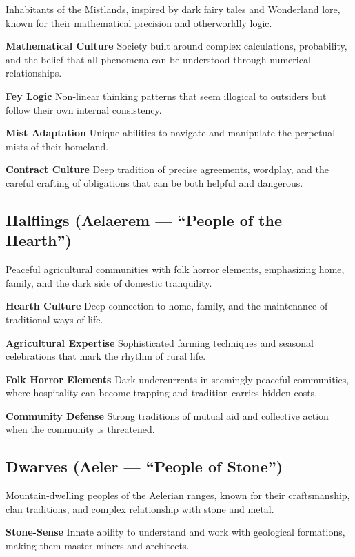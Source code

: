 \documentclass[11pt,twoside,openany]{book}
\begin{document}
Inhabitants of the Mistlands, inspired by dark fairy tales and Wonderland lore, known for their mathematical precision and otherworldly logic.

\textbf{Mathematical Culture} Society built around complex calculations, probability, and the belief that all phenomena can be understood through numerical relationships.

\textbf{Fey Logic} Non-linear thinking patterns that seem illogical to outsiders but follow their own internal consistency.

\textbf{Mist Adaptation} Unique abilities to navigate and manipulate the perpetual mists of their homeland.

\textbf{Contract Culture} Deep tradition of precise agreements, wordplay, and the careful crafting of obligations that can be both helpful and dangerous.

\subsection*{Halflings (Aelaerem --- ``People of the Hearth'')}

Peaceful agricultural communities with folk horror elements, emphasizing home, family, and the dark side of domestic tranquility.

\textbf{Hearth Culture} Deep connection to home, family, and the maintenance of traditional ways of life.

\textbf{Agricultural Expertise} Sophisticated farming techniques and seasonal celebrations that mark the rhythm of rural life.

\textbf{Folk Horror Elements} Dark undercurrents in seemingly peaceful communities, where hospitality can become trapping and tradition carries hidden costs.

\textbf{Community Defense} Strong traditions of mutual aid and collective action when the community is threatened.

\subsection*{Dwarves (Aeler --- ``People of Stone'')}

Mountain-dwelling peoples of the Aelerian ranges, known for their craftsmanship, clan traditions, and complex relationship with stone and metal.

\textbf{Stone-Sense} Innate ability to understand and work with geological formations, making them master miners and architects.
\end{document}
